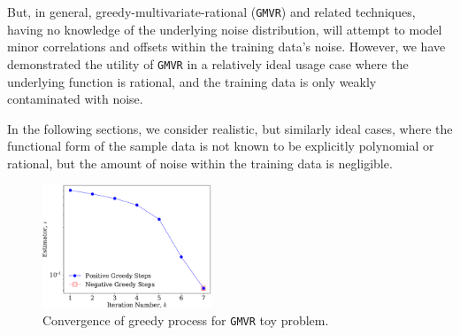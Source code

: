 \documentclass[twocolumn,aps,prd,floatfix,preprintnumbers,a4paper,nofootinbib,
superscriptaddress,10pt]{revtex4-1}
\def\gmvr#1{greedy-multivariate-rational#1
  (\texttt{GMVR}#1)\gdef\gmvr{\texttt{GMVR}}}
\begin{document}
%
But, in general, \gmvr{} and related techniques, having no knowledge of the underlying noise distribution, will attempt to model minor correlations and offsets within the training data's noise.
%
However, we have demonstrated the utility of \gmvr{} in a relatively ideal usage case where the underlying function is rational, and the training data is only weakly contaminated with noise.
%
\par In the following sections, we consider realistic, but similarly ideal cases, where the functional form of the sample data is not known to be explicitly polynomial or rational, but the amount of noise within the training data is negligible.
%
\begin{figure}[htb]
  \includegraphics[width=0.45\textwidth]{fig/issue3_pgreedy.pdf}
	\caption{ Convergence of greedy process for \gmvr{} toy problem. }
\end{figure}
%
%
%
%
\end{document}
